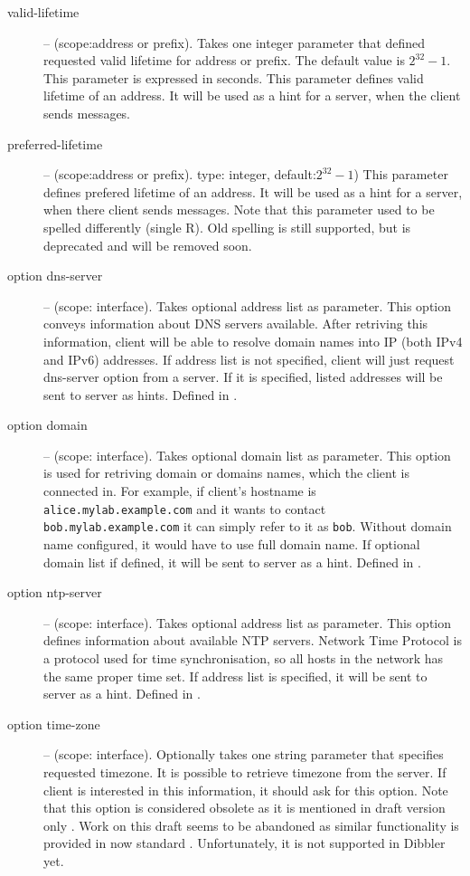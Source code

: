 \begin{description}
\item[valid-lifetime] -- (scope:address or prefix). Takes one integer
   parameter that defined requested valid lifetime for address or
   prefix. The default value is $2^{32}-1$. This parameter is
   expressed in seconds. This parameter defines valid lifetime of an
   address. It will be used as a hint for a server, when the client
   sends  messages.

\item[preferred-lifetime] -- (scope:address or prefix).
   type: integer, default:$2^{32}-1$) This parameter defines prefered
   lifetime of an address. It will be used as a hint for a server,
   when there client sends  messages. Note that this
  parameter used to be spelled differently (single R). Old spelling
  is still supported, but is deprecated and will be removed soon.

 \item[option dns-server] -- (scope: interface). Takes optional
   address list as parameter. This option conveys information about
   DNS servers available. After retriving this information, client
   will be able to resolve domain names into IP (both IPv4 and IPv6)
   addresses. If address list is not specified, client will just
   request dns-server option from a server. If it is specified, listed
   addresses will be sent to server as hints. Defined in \cite{rfc3596}.

 \item[option domain] -- (scope: interface). Takes optional domain
   list as parameter. This option is used for retriving domain or
   domains names, which the client is connected in. For example, if
   client's hostname is \verb+alice.mylab.example.com+ and it wants to
   contact \verb+bob.mylab.example.com+ it can simply refer to it
   as \verb+bob+. Without domain name configured, it would have to use
   full domain name. If optional domain list if defined, it will be
   sent to server as a hint. Defined in \cite{rfc3596}.

 \item[option ntp-server] -- (scope: interface). Takes optional address
   list as parameter. This option defines information about available NTP
   servers. Network Time Protocol \cite{rfc2030} is a protocol used
   for time synchronisation, so all hosts in the network has the same
   proper time set. If address list is specified, it will be sent to
   server as a hint. Defined in \cite{rfc4075}.

 \item[option time-zone] -- (scope: interface). Optionally takes one
   string parameter that specifies requested timezone. It is possible
   to retrieve timezone from the server. If client is interested in
   this information, it should ask for this option. Note that this
   option is considered obsolete as it is mentioned in draft version
   only \cite{draft-timezone}. Work on this draft seems to be
   abandoned as similar functionality is provided in now
   standard \cite{rfc4075}. Unfortunately, it is not supported in
   Dibbler yet.


\end{description}
